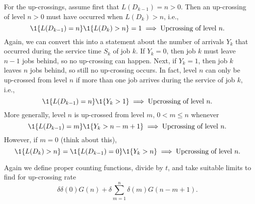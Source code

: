 For the up-crossings, assume first that $L(D_{k-1})=n>0$.  Then an up-crossing of level $n>0$  must have occurred when $L(D_k)>n$, i.e., 
 \begin{equation*}
 \1{L(D_{k-1}) = n}\1{L(D_k)>n} = 1 \implies   \text{Upcrossing of level $n$}.
 \end{equation*}
Again, we can convert this into a statement about  the number of
arrivals $Y_k$ that occurred during the service time $S_k$ of job $k$.  If $Y_k=0$, then
job $k$ must leave $n-1$ jobs behind, so no up-crossing can
happen. Next, if $Y_k=1$, then job $k$ leaves $n$ jobs behind, so
still no up-crossing occurs. In fact, level $n$ can only be  up-crossed from level $n$ if
more than one job arrives during the service of job $k$, i.e.,
\begin{equation*}
\1{L(D_{k-1})=n} \1{Y_{k}>1}  \implies   \text{Upcrossing of level $n$}.
\end{equation*}
More generally, level $n$ is up-crossed from level $m$, $0<m\leq n$ whenever
\begin{equation*}
\1{L(D_{k-1})=m} \1{Y_{k}>n-m+1}  \implies   \text{Upcrossing of level $n$}.
\end{equation*}
However,  if $m=0$ (think about this),
\begin{equation*}
\1{L(D_{k})>n} = \1{L(D_{k-1})=0} \1{Y_{k}>n}   \implies   \text{Upcrossing of level $n$}.
\end{equation*}

Again we define proper counting functions,  divide by $t$, and take suitable limits to find for up-crossing rate
\begin{equation}\label{eq:555}
\delta \delta(0) G(n) + \delta \sum_{m=1}^n \delta(m) G(n-m+1).
\end{equation}

